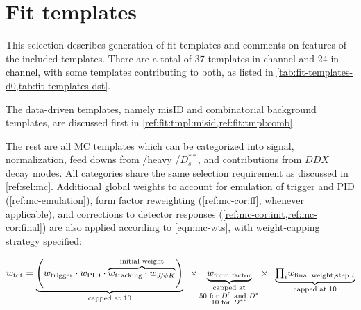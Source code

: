 \section{Fit templates}
\label{ref:fit:tmpl}

This selection describes generation of fit templates and comments on features
of the included templates.
There are a total of 37 templates in \Dz channel and 24 in \Dstar channel,
with some templates contributing to both, as listed in
\cref{tab:fit-templates-d0,tab:fit-templates-dst}.

The data-driven templates,
namely \muon misID and combinatorial background templates,
are discussed first in \cref{ref:fit:tmpl:misid,ref:fit:tmpl:comb}.

The rest are all MC templates which can be categorized into signal,
normalization, feed downs from \Dstst/heavy \Dstst/$D^{**}_s$, and contributions
from $DDX$ decay modes.
All categories share the same selection requirement as discussed in
\cref{ref:sel:mc}.
Additional global weights to account for emulation of trigger and PID
(\cref{ref:mc-emulation}),
form factor reweighting (\cref{ref:mc-cor:ff}, whenever applicable),
and corrections to detector responses (\cref{ref:mc-cor:init,ref:mc-cor:final})
are also applied according to \cref{eqn:mc-wts},
with weight-capping strategy specified:

\begin{equation}
    w_\text{tot} = \underbrace{\left(
            w_\text{trigger} \cdot w_\text{PID} \cdot
            \overbrace{
                w_\text{tracking} \cdot w_{\jpsi\kaon}
            }^\text{initial weight}
        \right)}_\text{capped at 10} \;\; \times
        \underbrace{w_\text{form factor}}_{\substack{
            \text{capped at} \\
            \text{50 for \Dz and \Dstar} \\
            \text{10 for $D^{**}$}
        }} \times \;\;
        \underbrace{
            {\textstyle\prod_i} w_\text{final weight,step $i$}
        }_\text{capped at 10}
        \label{eqn:mc-wts}
\end{equation}


